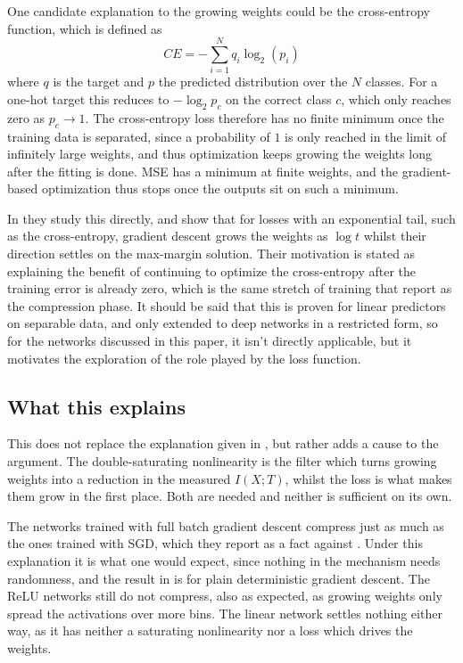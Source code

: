 One candidate explanation to the growing weights could be the cross-entropy
function, which is defined as
\begin{equation}
	CE = -\sum_{i=1}^{N} q_i\log_2(p_i)
\end{equation}
where $q$ is the target and $p$ the predicted distribution over the $N$
classes. For a one-hot target this reduces to $-\log_2 p_c$ on the correct
class $c$, which only reaches zero as $p_c\to1$. The cross-entropy loss
therefore has no finite minimum once the training data is separated, since a
probability of $1$ is only reached in the limit of infinitely large weights,
and thus optimization keeps growing the weights long after the fitting is
done. MSE has a minimum at finite weights, and the gradient-based optimization
thus stops once the outputs sit on such a minimum.

In \cite{soudry2018} they study this directly, and show that for losses with
an exponential tail, such as the cross-entropy, gradient descent grows the
weights as $\log t$ whilst their direction settles on the max-margin solution.
Their motivation is stated as explaining the benefit of continuing to optimize
the cross-entropy after the training error is already zero, which is the same
stretch of training that \cite{shwartzziv2017} report as the compression
phase. It should be said that this is proven for linear predictors on
separable data, and only extended to deep networks in a restricted form, so
for the networks discussed in this paper, it isn't directly applicable, but it
motivates the exploration of the role played by the loss function.

\subsection{What this explains}
This does not replace the explanation given in \cite{saxe2018}, but rather
adds a cause to the argument. The double-saturating nonlinearity is the
filter which turns growing weights into a reduction in the measured $I(X;T)$,
whilst the loss is what makes them grow in the first place. Both are needed
and neither is sufficient on its own.

The networks trained with full batch gradient descent compress just as much as
the ones trained with SGD, which they report as a fact against
\cite{shwartzziv2017}. Under this explanation it is what one would expect,
since nothing in the mechanism needs randomness, and the result in
\cite{soudry2018} is for plain deterministic gradient descent. The ReLU
networks still do not compress, also as expected, as growing weights only
spread the activations over more bins. The linear network settles nothing
either way, as it has neither a saturating nonlinearity nor a loss which
drives the weights.

